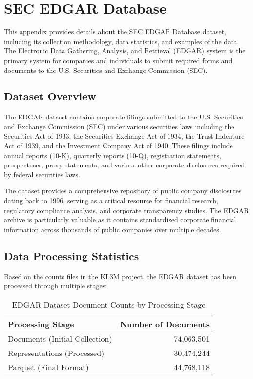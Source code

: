 \section{SEC EDGAR Database}
\label{appendix:edgar}

This appendix provides details about the SEC EDGAR Database dataset, including its collection methodology, data statistics, and examples of the data. The Electronic Data Gathering, Analysis, and Retrieval (EDGAR) system is the primary system for companies and individuals to submit required forms and documents to the U.S. Securities and Exchange Commission (SEC).

\subsection{Dataset Overview}

The EDGAR dataset contains corporate filings submitted to the U.S. Securities and Exchange Commission (SEC) under various securities laws including the Securities Act of 1933, the Securities Exchange Act of 1934, the Trust Indenture Act of 1939, and the Investment Company Act of 1940. These filings include annual reports (10-K), quarterly reports (10-Q), registration statements, prospectuses, proxy statements, and various other corporate disclosures required by federal securities laws.

The dataset provides a comprehensive repository of public company disclosures dating back to 1996, serving as a critical resource for financial research, regulatory compliance analysis, and corporate transparency studies. The EDGAR archive is particularly valuable as it contains standardized corporate financial information across thousands of public companies over multiple decades.

\subsection{Data Processing Statistics}

Based on the counts files in the KL3M project, the EDGAR dataset has been processed through multiple stages:

\begin{table}[h]
\centering
\begin{tabular}{|l|r|}
\hline
\textbf{Processing Stage} & \textbf{Number of Documents} \\
\hline
Documents (Initial Collection) & 74,063,501 \\
Representations (Processed) & 30,474,244 \\
Parquet (Final Format) & 44,768,118 \\
\hline
\end{tabular}
\caption{EDGAR Dataset Document Counts by Processing Stage}
\label{tab:edgar_counts}
\end{table}

